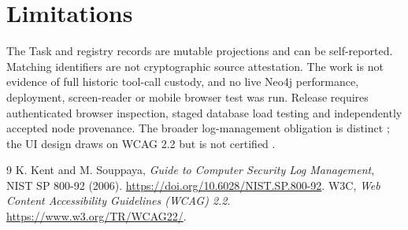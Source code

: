\documentclass[11pt]{article}
\begin{document}
\section{Limitations}
The Task and registry records are mutable projections and can be self-reported. Matching identifiers are not cryptographic source attestation. The work is not evidence of full historic tool-call custody, and no live Neo4j performance, deployment, screen-reader or mobile browser test was run. Release requires authenticated browser inspection, staged database load testing and independently accepted node provenance. The broader log-management obligation is distinct \cite{nist92}; the UI design draws on WCAG 2.2 but is not certified \cite{wcag}.
\begin{thebibliography}{9}
 K. Kent and M. Souppaya, \emph{Guide to Computer Security Log Management}, NIST SP 800-92 (2006). \url{https://doi.org/10.6028/NIST.SP.800-92}.
 W3C, \emph{Web Content Accessibility Guidelines (WCAG) 2.2}. \url{https://www.w3.org/TR/WCAG22/}.
\end{thebibliography}
\end{document}
